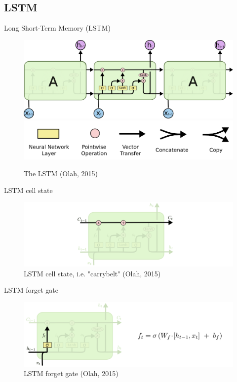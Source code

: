 \subsection{LSTM}


\begin{frame}{Long Short-Term Memory (LSTM)}

\begin{figure}[h]
\centering
\includegraphics[width=1\textwidth]{fig/Olah_LSTM1.png}
\includegraphics[width=1\textwidth]{fig/Olah_LSTM1b.png}
\caption{The LSTM (Olah, 2015)}
\end{figure}

\end{frame}


\begin{frame}{LSTM cell state}

\begin{figure}[h]
\centering
\includegraphics[width=1\textwidth]{fig/Olah_LSTM2.png}
\caption{LSTM cell state, i.e. "carrybelt" (Olah, 2015)}
\end{figure}

\end{frame}

\begin{frame}{LSTM forget gate}

\begin{figure}[h]
\centering
\includegraphics[width=1\textwidth]{fig/Olah_LSTM3_forget.png}
\caption{LSTM forget gate (Olah, 2015)}
\end{figure}

\end{frame}


